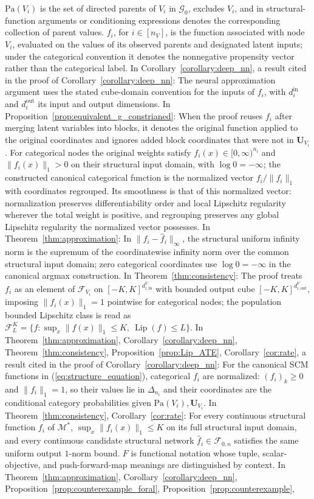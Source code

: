 \documentclass[12pt]{article}
\theoremstyle{plain}
\theoremstyle{definition}
\theoremstyle{remark}
\begin{document}
$\text{Pa}(V_i)$ is the set of directed parents of $V_i$ in $\mathcal{G}_0$, excludes $V_i$, and in structural-function arguments or conditioning expressions denotes the corresponding collection of parent values. $f_i$, for $i\in[n_V]$, is the function associated with node $V_i$, evaluated on the values of its observed parents and designated latent inputs; under the categorical convention it denotes the nonnegative propensity vector rather than the categorical label. In Corollary~\ref{corollary:deep_nn}, a result cited in the proof of Corollary~\ref{corollary:deep_nn}: The neural approximation argument uses the stated cube-domain convention for the inputs of $f_i$, with $d_i^{\text{in}}$ and $d_i^{\text{out}}$ its input and output dimensions. In Proposition~\ref{prop:equivalent_g_constrianed}: When the proof reuses $f_i$ after merging latent variables into blocks, it denotes the original function applied to the original coordinates and ignores added block coordinates that were not in $\boldsymbol{U}_{V_i}$. For categorical nodes the original weights satisfy $f_i(x)\in[0,\infty)^{n_i}$ and $\|f_i(x)\|_1>0$ on their structural input domain, with $\log0=-\infty$; the constructed canonical categorical function is the normalized vector $f_i/\|f_i\|_1$ with coordinates regrouped. Its smoothness is that of this normalized vector: normalization preserves differentiability order and local Lipschitz regularity wherever the total weight is positive, and regrouping preserves any global Lipschitz regularity the normalized vector possesses. In Theorem~\ref{thm:approximation}: In $\|f_i-\hat f_i\|_\infty$, the structural uniform infinity norm is the supremum of the coordinatewise infinity norm over the common structural input domain; zero categorical coordinates use $\log0=-\infty$ in the canonical argmax construction. In Theorem~\ref{thm:consistency}: The proof treats $f_i$ as an element of $\mathcal{F}_{V_i}$ on $[-K,K]^{d_{i,\text{in}}^V}$ with bounded output cube $[-K,K]^{d_{i,\text{out}}^V}$, imposing $\|f_i(x)\|_1=1$ pointwise for categorical nodes; the population bounded Lipschitz class is read as $\mathcal F_L^K=\{f:\sup_x\|f(x)\|_1\leqslant K,\ \operatorname{Lip}(f)\leqslant L\}$. In Theorem~\ref{thm:approximation}, Corollary~\ref{corollary:deep_nn}, Theorem~\ref{thm:consistency}, Proposition~\ref{prop:Lip_ATE}, Corollary~\ref{cor:rate}, a result cited in the proof of Corollary~\ref{corollary:deep_nn}: For the canonical SCM functions in (\ref{eq:structure_equation}), categorical $f_i$ are normalized: $(f_i)_k\geqslant0$ and $\|f_i\|_1=1$, so their values lie in $\Delta_{n_i}$ and their coordinates are the conditional category probabilities given $\text{Pa}(V_i),\boldsymbol{U}_{V_i}$. In Theorem~\ref{thm:consistency}, Corollary~\ref{cor:rate}: For every continuous structural function $f_i$ of $\mathcal M^*$, $\sup_x\|f_i(x)\|_1\leqslant K$ on its full structural input domain, and every continuous candidate structural network $\hat f_i\in\mathcal F_{0,n}$ satisfies the same uniform output $1$-norm bound. $F$ is functional notation whose tuple, scalar-objective, and push-forward-map meanings are distinguished by context. In Theorem~\ref{thm:approximation}, Corollary~\ref{corollary:deep_nn}, Proposition~\ref{prop:counterexample_foral}, Proposition~\ref{prop:counterexample}, 
\end{document}
